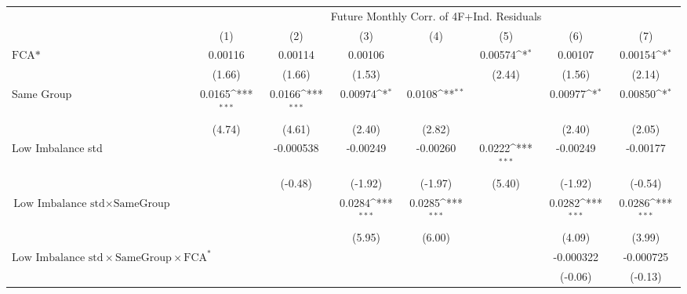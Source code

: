 {
\def\sym#1{\ifmmode^{#1}\else\(^{#1}\)\fi}
\begin{tabular}{l*{7}{c}}
\hline\hline
                &\multicolumn{7}{c}{Future Monthly Corr. of 4F+Ind. Residuals}                                                                       \\\cmidrule(lr){2-8}
                &\multicolumn{1}{c}{(1)}         &\multicolumn{1}{c}{(2)}         &\multicolumn{1}{c}{(3)}         &\multicolumn{1}{c}{(4)}         &\multicolumn{1}{c}{(5)}         &\multicolumn{1}{c}{(6)}         &\multicolumn{1}{c}{(7)}         \\
\hline
$ \text{FCA*} $ &  0.00116         &  0.00114         &  0.00106         &                  &  0.00574\sym{*}  &  0.00107         &  0.00154\sym{*}  \\
                &   (1.66)         &   (1.66)         &   (1.53)         &                  &   (2.44)         &   (1.56)         &   (2.14)         \\
[1em]
Same Group      &   0.0165\sym{***}&   0.0166\sym{***}&  0.00974\sym{*}  &   0.0108\sym{**} &                  &  0.00977\sym{*}  &  0.00850\sym{*}  \\
                &   (4.74)         &   (4.61)         &   (2.40)         &   (2.82)         &                  &   (2.40)         &   (2.05)         \\
[1em]
Low Imbalance std&                  &-0.000538         & -0.00249         & -0.00260         &   0.0222\sym{***}& -0.00249         & -0.00177         \\
                &                  &  (-0.48)         &  (-1.92)         &  (-1.97)         &   (5.40)         &  (-1.92)         &  (-0.54)         \\
[1em]
 $ \text{Low Imbalance std} \times {\text{SameGroup} } $ &                  &                  &   0.0284\sym{***}&   0.0285\sym{***}&                  &   0.0282\sym{***}&   0.0286\sym{***}\\
                &                  &                  &   (5.95)         &   (6.00)         &                  &   (4.09)         &   (3.99)         \\
[1em]
 $ \text{Low Imbalance std} \times {\text{SameGroup} } \times \text{FCA}^*  $ &                  &                  &                  &                  &                  &-0.000322         &-0.000725         \\
                &                  &                  &                  &                  &                  &  (-0.06)         &  (-0.13)         \\

\end{tabular}}
